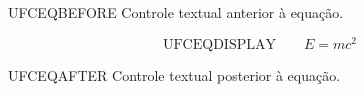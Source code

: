 \documentclass{abntexto-ufc}
\begin{document}
\noindent UFCEQBEFORE Controle textual anterior à equação.

\begin{equation}
  \mbox{UFCEQDISPLAY}\qquad E = mc^2
\end{equation}

\noindent UFCEQAFTER Controle textual posterior à equação.
\end{document}
